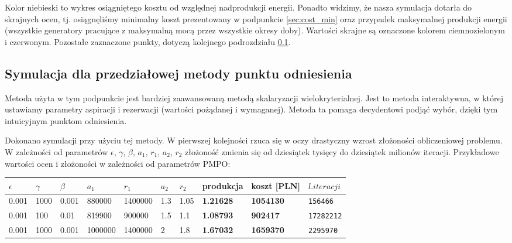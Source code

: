 \documentclass[12pt, twoside, hidelinks, a4paper]{article}
\begin{document}
Kolor niebieski to wykres osiągniętego kosztu od względnej nadprodukcji energii. Ponadto widzimy, że nasza symulacja dotarła do skrajnych ocen, tj. osiągnęliśmy minimalny koszt prezentowany w podpunkcie \ref{sec:cost_min} oraz przypadek maksymalnej produkcji energii (wszystkie generatory pracujące z maksymalną mocą przez wszystkie okresy doby). Wartości skrajne są oznaczone kolorem ciemnozielonym i czerwonym. Pozostałe zaznaczone punkty, dotyczą kolejnego podrozdziału \ref{sec:pmpo}.

\subsection{Symulacja dla przedziałowej metody punktu odniesienia} \label{sec:pmpo}
Metoda użyta w tym podpunkcie jest bardziej zaawansowaną metodą skalaryzacji wielokryterialnej. Jest to metoda interaktywna, w której ustawiamy parametry aspiracji i rezerwacji (wartości pożądanej i wymaganej). Metoda ta pomaga decydentowi podjąć wybór, dzięki tym intuicyjnym punktom odniesienia.

Dokonano symulacji przy użyciu tej metody. W pierwszej kolejności rzuca się w oczy drastyczny wzrost złożoności obliczeniowej problemu. W zależności od parametrów $\epsilon$, $\gamma$, $\beta$, $a_1$, $r_1$, $a_2$, $r_2$ złożoność zmienia się od dziesiątek tysięcy do dziesiątek milionów iteracji. Przykładowe wartości ocen i złożoności w zależności od parametrów PMPO:

\begin{table}[H]
\begin{tabular}{llllllllll}
$\epsilon$ & $\gamma$ & $\beta$ & $a_1$ & $r_1$ & $a_2$ & $r_2$ & \textbf{produkcja} & \textbf{koszt [PLN]} & $l. iteracji$ \\ \hline
0.001                            & 1000                           & 0.001                         & 880000        & 1400000       & 1.3           & 1.05          & \textbf{1.21628}            & \textbf{1054130}        & \texttt{156466}               \\
0.001                            & 100                            & 0.01                          & 819900        & 900000        & 1.5           & 1.1           & \textbf{1.08793}            & \textbf{902417}         & \texttt{17282212}             \\
0.001                            & 1000                           & 0.001                         & 1000000       & 1400000       & 2             & 1.8           & \textbf{1.67032}            & \textbf{1659370}        & \texttt{2295970}             
\end{tabular}
\end{table}
\end{document}
